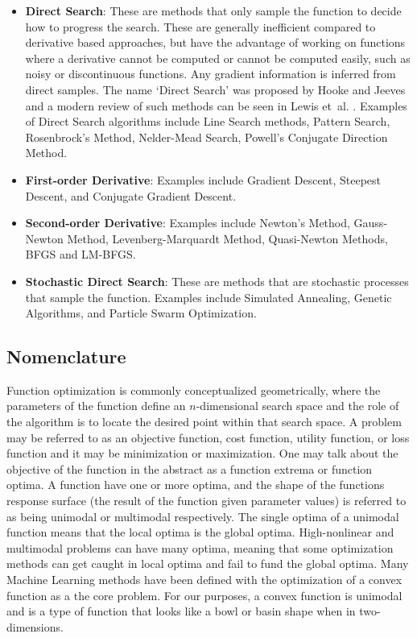 \begin{bibunit}
\begin{itemize}
	\item \textbf{Direct Search}: These are methods that only sample the function to decide how to progress the search. These are generally inefficient compared to derivative based approaches, but have the advantage of working on functions where a derivative cannot be computed or cannot be computed easily, such as noisy or discontinuous functions. Any gradient information is inferred from direct samples. The name `Direct Search' was proposed by Hooke and Jeeves \cite{Hooke1961} and a modern review of such methods can be seen in Lewis et~al. \cite{Lewis2000}. Examples of Direct Search algorithms include Line Search methods, Pattern Search, Rosenbrock's Method, Nelder-Mead Search, Powell's Conjugate Direction Method.
	\item \textbf{First-order Derivative}: Examples include Gradient Descent, Steepest Descent, and Conjugate Gradient Descent.
	\item \textbf{Second-order Derivative}: Examples include Newton's Method, Gauss-Newton Method, Levenberg-Marquardt Method, Quasi-Newton Methods, BFGS and LM-BFGS.
	\item \textbf{Stochastic Direct Search}: These are methods that are stochastic processes that sample the function. Examples include Simulated Annealing, Genetic Algorithms, and Particle Swarm Optimization.
\end{itemize}

\subsection{Nomenclature}
Function optimization is commonly conceptualized geometrically, where the parameters of the function define an $n$-dimensional search space and the role of the algorithm is to locate the desired point within that search space.
A problem may be referred to as an objective function, cost function, utility function, or loss function and it may be minimization or maximization. One may talk about the objective of the function in the abstract as a function extrema or function optima. 
A function have one or more optima, and the shape of the functions response surface (the result of the function given parameter values) is referred to as being unimodal or multimodal respectively. The single optima of a unimodal function means that the local optima is the global optima. High-nonlinear and multimodal problems can have many optima, meaning that some optimization methods can get caught in local optima and fail to fund the global optima.
Many Machine Learning methods have been defined with the optimization of a convex function as a the core problem. For our purposes, a convex function is unimodal and is a type of function that looks like a bowl or basin shape when in two-dimensions.


\end{bibunit}
